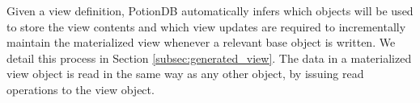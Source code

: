 \documentclass[sigplan,review,anonymous]{acmart}
\begin{document}
Given a view definition, PotionDB automatically infers which objects will be used to store the view contents and
which view updates are required to incrementally maintain the materialized view whenever a relevant base object 
is written. We detail this process in Section \ref{subsec:generated_view}.
The data in a materialized view object is read in the same way as any other object, by issuing read
operations to the view object.


\end{document}
